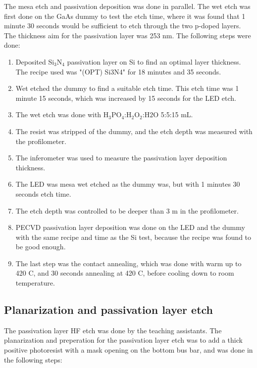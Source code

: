 The mesa etch and passivation deposition was done in parallel.
The wet etch was first done on the GaAs dummy to test the etch time, where it was found that 1 minute 30 seconds would be sufficient to etch through the two p-doped layers.
The thickness aim for the passivation layer was 253 nm. 
The following steps were done:

\begin{enumerate}
    \item Deposited Si$_3$N$_4$ passivation layer on Si to find an optimal layer thickness. The recipe used was "(OPT) Si3N4" for 18 minutes and 35 seconds.
    \item Wet etched the dummy to find a suitable etch time. This etch time was 1 minute 15 seconds, which was increased by 15 seconds for the LED etch.
    \item The wet etch was done with H$_3$PO$_4$:H$_2$O$_2$:H$2$O 5:5:15 mL.
    \item The resist was stripped of the dummy, and the etch depth was measured with the profilometer.
    \item The inferometer was used to measure the passivation layer deposition thickness.
    \item The LED was mesa wet etched as the dummy was, but with 1 minutes 30 seconds etch time.
    \item The etch depth was controlled to be deeper than 3 \textmu m in the profilometer.
    \item PECVD passivation layer deposition was done on the LED and the dummy with the same recipe and time as the Si test, because the recipe was found to be good enough.
    \item The last step was the contact annealing, which was done with warm up to 420 \textdegree C, and 30 seconds annealing at 420 \textdegree C, before cooling down to room temperature.
\end{enumerate}



\subsection{Planarization and passivation layer etch}
\label{methods:Planarization}

The passivation layer HF etch was done by the teaching assistants.
The planarization and preperation for the passivation layer etch was to add a thick positive photoresist with a mask opening on the bottom bus bar, and was done in the following steps:


